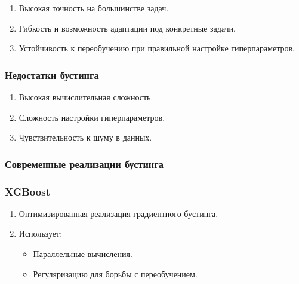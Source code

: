 \begin{enumerate}
\begin{enumerate}
\def\labelenumi{\arabic{enumi}.}
\tightlist
\item
  Высокая точность на большинстве задач.
\item
  Гибкость и возможность адаптации под конкретные задачи.
\item
  Устойчивость к переобучению при правильной настройке гиперпараметров.
\end{enumerate}

\hypertarget{ux43dux435ux434ux43eux441ux442ux430ux442ux43aux438-ux431ux443ux441ux442ux438ux43dux433ux430}{%
\subsubsection*{Недостатки
бустинга}\label{ux43dux435ux434ux43eux441ux442ux430ux442ux43aux438-ux431ux443ux441ux442ux438ux43dux433ux430}}

\begin{enumerate}
\def\labelenumi{\arabic{enumi}.}
\tightlist
\item
  Высокая вычислительная сложность.
\item
  Сложность настройки гиперпараметров.
\item
  Чувствительность к шуму в данных.
\end{enumerate}

\hypertarget{ux441ux43eux432ux440ux435ux43cux435ux43dux43dux44bux435-ux440ux435ux430ux43bux438ux437ux430ux446ux438ux438-ux431ux443ux441ux442ux438ux43dux433ux430}{%
\subsubsection*{Современные реализации
бустинга}\label{ux441ux43eux432ux440ux435ux43cux435ux43dux43dux44bux435-ux440ux435ux430ux43bux438ux437ux430ux446ux438ux438-ux431ux443ux441ux442ux438ux43dux433ux430}}

\hypertarget{xgboost}{%
\subsubsection*{XGBoost}\label{xgboost}}

\begin{enumerate}
\def\labelenumi{\arabic{enumi}.}
\tightlist
\item
  Оптимизированная реализация градиентного бустинга.
\item
  Использует:

  \begin{itemize}
  \tightlist
  \item
    Параллельные вычисления.
  \item
    Регуляризацию для борьбы с переобучением.
  \end{itemize}
\end{enumerate}


\end{enumerate}
